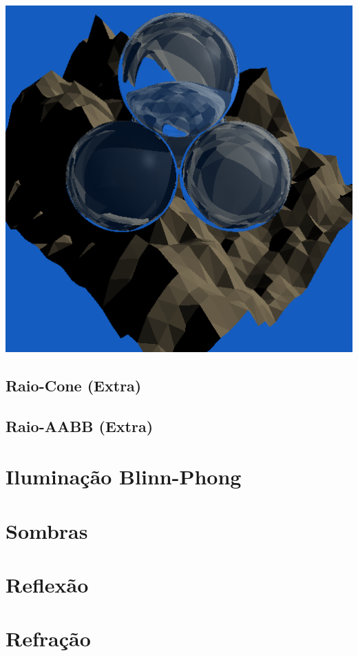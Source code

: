 \documentclass{article}
\begin{document}
        \includegraphics[scale=0.27]{mount_high} 

    \subsection*{Raio-Cone (Extra)}

    \subsection*{Raio-AABB (Extra)}

    \section*{Iluminação Blinn-Phong}

    \section*{Sombras}

    \section*{Reflexão}

    \section*{Refração}
\end{document}
